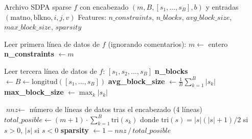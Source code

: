\begin{algorithm}[H]
\caption{Extracción de features estructurales básicas desde un archivo \texttt{.dat-s}}
\label{alg:features_basicas}
\begin{algorithmic}[1]
\Require Archivo SDPA sparse $f$ con encabezado $(m, B, [s_1,\dots,s_B], b)$
         y entradas $(\text{matno}, \text{blkno}, i, j, v)$
\Ensure  Features: $n\_constraints$, $n\_blocks$, $avg\_block\_size$,
         $max\_block\_size$, $sparsity$

\State Leer primera línea de datos de $f$ (ignorando comentarios): $m \gets$ entero
\State \textbf{n\_constraints} $\gets m$

\State Leer tercera línea de datos de $f$: $[s_1, s_2, \dots, s_B]$
\State \textbf{n\_blocks} $\gets B \gets \text{longitud}([s_1,\dots,s_B])$
\State \textbf{avg\_block\_size} $\gets \frac{1}{B}\sum_{k=1}^{B} |s_k|$
\State \textbf{max\_block\_size} $\gets \max_{k} |s_k|$

\Statex
\State {}
\State $\textit{nnz} \gets$ número de líneas de datos tras el encabezado (4 líneas)
\State $\textit{total\_posible} \gets (m+1) \cdot \sum_{k=1}^{B} \text{tri}(s_k)$
\Statex \hspace{2.5em} donde $\text{tri}(s) = |s|(|s|+1)/2$ si $s>0$, \;$|s|$ si $s<0$
\State \textbf{sparsity} $\gets 1 - \textit{nnz} \,/\, \textit{total\_posible}$
\end{algorithmic}
\end{algorithm}
